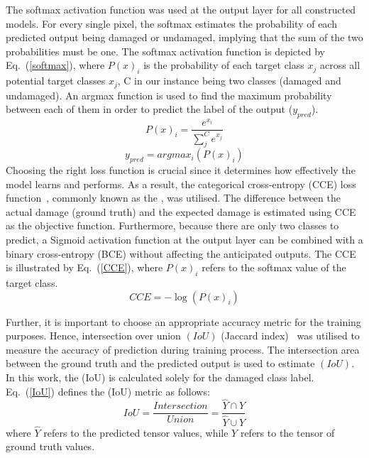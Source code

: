 The softmax activation function was used at the output layer for all constructed models.
For every single pixel, the softmax estimates the probability of each predicted output being damaged or undamaged, implying that the sum of the two probabilities must be one.
The softmax activation function is depicted by Eq.~(\ref{softmax}), where \(P(x)_{i}\) is the probability of each target class \(x_{j}\) across all potential target classes \(x_{j}\), C in our instance being two classes (damaged and undamaged).
An argmax function is used to find the maximum probability between each of them in order to predict the label of the output (\(y_{pred}\)).
\begin{equation}
	P(x)_{i} = \frac{e^{x_{i}}}{\sum_{j}^{C} e^{x_{j}}}
	\label{softmax}
\end{equation} 
\begin{equation}
	y_{pred} = argmax_{i}\left( P(x)_{i} \right)
	\label{argmax}
\end{equation}
Choosing the right loss function is crucial since it determines how effectively the model learns and performs.
As a result, the categorical cross-entropy (CCE) loss function~\cite{Bonaccorso2020}, commonly known as the , was utilised.
The difference between the actual damage (ground truth) and the expected damage is estimated using CCE as the objective function.
Furthermore, because there are only two classes to predict, a Sigmoid activation function at the output layer can be combined with a binary cross-entropy (BCE) without affecting the anticipated outputs.
The CCE is illustrated by Eq.~(\ref{CCE}), where \( P(x)_{i}\) refers to the softmax value of the target class.
\begin{equation}	
	CCE = -\log\left( P(x)_{i} \right)
	\label{CCE}
\end{equation}

Further, it is important to choose an appropriate accuracy metric for the training purposes.
Hence, intersection over union \((IoU)\) (Jaccard index)~\cite{Bertels2019} was utilised to measure the accuracy of prediction during training process.
The intersection area between the ground truth and the predicted output is used to estimate \((IoU)\).
In this work, the (IoU) is calculated solely for the damaged class label.
Eq.~(\ref{IoU}) defines the (IoU) metric as follows:
\begin{equation}
	IoU = \frac{Intersection}{Union} = \frac{\hat{Y} \cap Y}{\hat{Y} \cup Y} 
	\label{IoU}
\end{equation}
where \(\hat{Y}\) refers to the predicted tensor values, while \(Y\) refers to the tensor of ground truth values.

